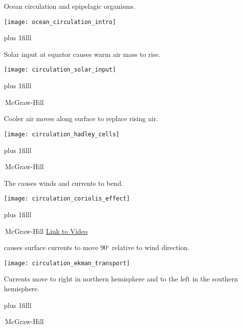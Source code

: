 \documentclass[t,handout]{beamer}  %
\begin{document}
\begin{frame}[t]{Ocean circulation and epipelagic organisms.}
	\begin{center}
	\texttt{[image: ocean\_circulation\_intro]}
	\end{center}

\vskip0pt plus 1filll

\end{frame}

\begin{frame}[t]{Solar input at equator causes warm air mass to rise.}
	\begin{center}
	\texttt{[image: circulation\_solar\_input]}
	\end{center}

\vskip0pt plus 1filll

\tiny \textcopyright\,McGraw-Hill
\end{frame}

\begin{frame}[t]{Cooler air moves along surface to replace rising air.}
	\begin{center}
	\texttt{[image: circulation\_hadley\_cells]}
	\end{center}

\vskip0pt plus 1filll

\tiny \textcopyright\,McGraw-Hill
\end{frame}


\begin{frame}[t]{The  causes winds and currents to bend.}
	\begin{center}
	\texttt{[image: circulation\_coriolis\_effect]}
	\end{center}

\vskip0pt plus 1filll

\tiny \textcopyright\,McGraw-Hill \hfill \href{https://www.youtube.com/watch?v=_36MiCUS1ro}{Link to Video}
\end{frame}

\begin{frame}[t]{ causes surface currents to move 90$^\circ$ relative to wind direction.}
	\begin{multicols}{2}

		\texttt{[image: circulation\_ekman\_transport]}

	\columnbreak

		\hangpara\parbox[t]{0.45\textwidth}{Currents move to right in northern hemisphere and to the left in the southern hemisphere.}
	
	
	
	\end{multicols}

	\vskip0pt plus 1filll

	\tiny \textcopyright\,McGraw-Hill

\end{frame}
\end{document}
